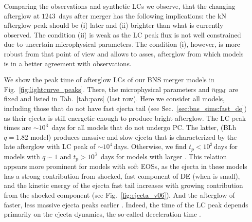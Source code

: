 
Comparing the \GRB{} observations and synthetic \acp{LC} we observe, that the 
changing afterglow at $1243$~days after merger has the following implications:
the \ac{kN} afterglow peak should be (i) later and (ii) brighter than what is
currently observed. 
%
The condition (ii) is weak as the \ac{LC} peak flux is not well constrained due to 
uncertain microphysical parameters.
The condition (i), however, is more robust from that point of view and allows to 
asses, afterglow from which models is in a better agreement with observations.

We show the peak time of afterglow \acp{LC} of our \ac{BNS} merger models in 
Fig.~\ref{fig:lightcurve_peaks}. There, the microphysical parameters and $n_{\text{ISM}}$ are fixed 
and listed in Tab.~\ref{tab:pars} (last row). 
Here we consider all models, including those that do not have fast ejecta tail 
(see Sec.~\ref{sec:bns_sims:fast_de}) as their ejecta is still energetic enough 
to produce bright afterglow. 
%
The \ac{LC} peak times are ${\sim}10^3$~days for all models that do not undergo \ac{PC}. 
The latter, (BLh $q=1.82$ model) produces massive and 
slow ejecta that is characterized by the late afterglow 
with \ac{LC} peak of ${\sim}10^4\,$days.
%
Otherwise, we find $t_{p}<10^3\,$days for models with $q\sim1$ and 
$t_p>10^3$~days for models with larger \mr{}. 
%
This relation appears more prominent for 
models with soft \acp{EOS}, as the ejecta in these models has a strong contribution from 
shocked, fast component of \ac{DE} (when \mr{} is small), and the 
kinetic energy of the ejecta fast tail increases with 
growing contribution from the shocked component (see Fig.~\ref{fig:ejecta_v06}). 
And the afterglow of faster, less massive ejecta peaks earlier 
\citep[\eg][]{Hotokezaka:2015eja}.
Indeed, the time of the \ac{LC} peak depends primarily on the ejecta 
dynamics, the so-called deceleration time \citep[\eg][]{Piran:2012wd}.

